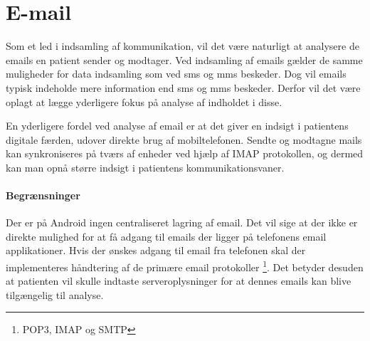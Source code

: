 \section{E-mail}
Som et led i indsamling af kommunikation, vil det være naturligt at analysere de emails en patient sender og modtager.
Ved indsamling af emails gælder de samme muligheder for data indsamling som ved sms og mms beskeder.
Dog vil emails typisk indeholde mere information end sms og mms beskeder.
Derfor vil det være oplagt at lægge yderligere fokus på analyse af indholdet i disse.

En yderligere fordel ved analyse af email er at det giver en indsigt i patientens digitale færden, udover direkte brug af mobiltelefonen.
Sendte og modtagne mails kan synkroniseres på tværs af enheder ved hjælp af IMAP protokollen, og dermed kan man opnå større indsigt i patientens kommunikationsvaner.

\paragraph{Begrænsninger}
Der er på Android ingen centraliseret lagring af email.
Det vil sige at der ikke er direkte mulighed for at få adgang til emails der ligger på telefonens email applikationer.
Hvis der ønskes adgang til email fra telefonen skal der implementeres håndtering af de primære email protokoller \footnote{POP3, IMAP og SMTP}.
Det betyder desuden at patienten vil skulle indtaste serveroplysninger for at dennes emails kan blive tilgængelig til analyse.